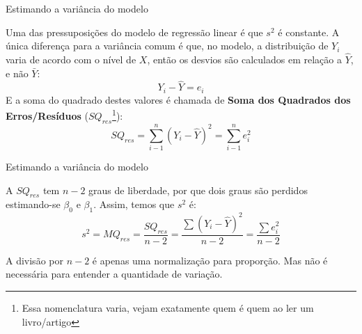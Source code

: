 \documentclass{beamer}\usepackage[]{graphicx}\usepackage[]{color}
\begin{document}
\begin{frame}{Estimando a variância do modelo}

\begin{small}
Uma das pressuposições do modelo de regressão linear é que $s^2$ é constante. A única diferença para a variância comum é que, no modelo, a distribuição de $Y_i$ varia de acordo com o nível de $X$, então os desvios são calculados em relação a $\hat Y$, e não $\bar Y$: \pause
\vfill
\begin{equation*}
Y_i - \hat Y = e_i
\end{equation*}
\vfill \pause
E a soma do quadrado destes valores é chamada de \textbf{Soma dos Quadrados dos Erros/Resíduos} ($SQ_{res}$\footnote{\tiny{Essa nomenclatura varia, vejam exatamente quem é quem ao ler um livro/artigo}}):
\begin{equation*}
SQ_{res} =\sum_{i-1}^{n}(Y_i - \hat Y)^2 = \sum_{i-1}^{n}e_i^2
\end{equation*}
\end{small}

\end{frame}


\begin{frame}{Estimando a variância do modelo}

\begin{small}
A $SQ_{res}$ tem $n-2$ graus de liberdade, por que dois graus são perdidos estimando-se $\beta _0$ e $\beta_1$. Assim, temos que $s^2$ é:
\vfill 
\begin{equation*}
s^2 = MQ_{res} = \frac{SQ_{res}}{n-2} = \frac{\sum(Y_i - \hat Y)^2}{n-2} = \frac{\sum e_i^2}{n-2}
\end{equation*}
\end{small}
\vfill
A divisão por $n - 2$ é apenas uma normalização para proporção. Mas não é necessária para entender a quantidade de variação. 
\end{frame}
\end{document}
